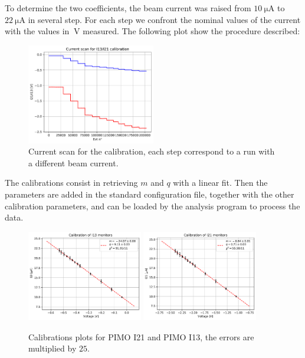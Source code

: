 To determine the two coefficients, the beam current was raised from $\SI{10}{\micro \ampere}$ to $\SI{22}{\micro \ampere}$ in several step. For each step we confront the nominal values of the current with the values in $\SI{}{\volt}$ measured. The following plot show the procedure described:

\begin{figure}[ht]
\centering
\includegraphics[width = 0.5\textwidth]{Analysis/Calibrations/ScanI21I13.pdf}
\caption{Current scan for the calibration, each step correspond to a run with a different beam current.}
\label{fig:ScanCurrent}
\end{figure}

The calibrations consist in retrieving $m$ and $q$ with a linear fit. Then the parameters are added in the standard configuration file, together with the other calibration parameters, and can be loaded by the analysis program to process the data.  

\begin{figure}[hbtp]
\centering
\includegraphics[width = 0.45\textwidth]{Analysis/Calibrations/I13.pdf}
\includegraphics[width = 0.45\textwidth]{Analysis/Calibrations/I21.pdf} 
\caption{Calibrations plots for PIMO I21 and PIMO I13, the errors are multiplied by $25$.}
\label{fig:PimoCalib}
\end{figure}

